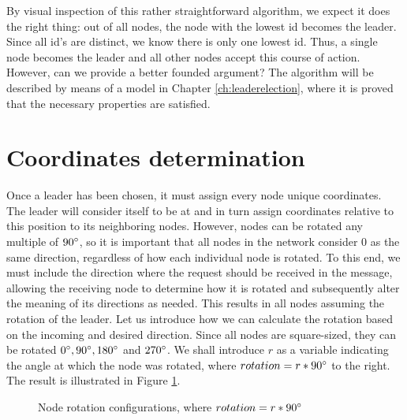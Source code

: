 By visual inspection of this rather straightforward algorithm, we expect it does the right thing: out of all nodes, the node with the lowest id becomes the leader. Since all id's are distinct, we know there is only one lowest id. Thus, a single node becomes the leader and all other nodes accept this course of action. However, can we provide a better founded argument? The algorithm will be described by means of a model in Chapter \ref{ch:leaderelection}, where it is proved that the necessary properties are satisfied.

\section{Coordinates determination}
\label{sec:opcoorddet}

Once a leader has been chosen, it must assign every node unique coordinates. The leader will consider itself to be at  and in turn assign coordinates relative to this position to its neighboring nodes. However, nodes can be rotated any multiple of $90 \degree$, so it is important that all nodes in the network consider $0$ as the same direction, regardless of how each individual node is rotated. To this end, we must include the direction where the request should be received in the message, allowing the receiving node to determine how it is rotated and subsequently alter the meaning of its directions as needed. This results in all nodes assuming the rotation of the leader. Let us introduce how we can calculate the rotation based on the incoming and desired direction. Since all nodes are square-sized, they can be rotated $0 \degree, 90 \degree, 180 \degree$ and $270 \degree$. We shall introduce $r$ as a variable indicating the angle at which the node was rotated, where $rotation = r * 90 \degree$ to the right. The result is illustrated in Figure \ref{fig:rotations}.

\begin{figure}[h]
  \centering
 \caption{\label{fig:rotations} Node rotation configurations, where $rotation = r * 90 \degree$}
\end{figure}

